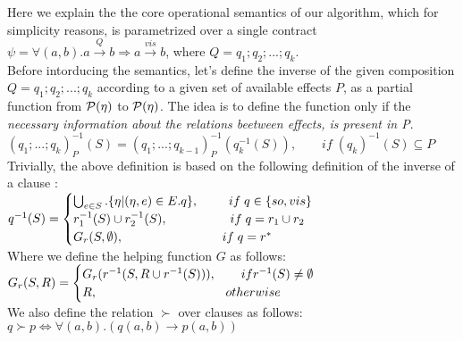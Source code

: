 Here we explain the the core operational semantics of our algorithm, which for simplicity reasons, 
is parametrized over a single contract 
$\psi = \forall (a,b). a \xrightarrow{Q} b  \Rightarrow a
\xrightarrow{vis} b$, where $Q=q_1;q_2;...;q_k$. 
\\Before intorducing the semantics, let's define the inverse of the
given composition $Q=q_1;q_2;...;q_k$ according to a given
set of available effects $P$, as a partial function from $\mathcal{P}(\eta)$ to
$\mathcal{P}(\eta)$. The idea is to define the function only if the \emph{necessary information about the relations beetween effects, is present in P}.
\\ $
(q_1;...;q_k)^{-1}_P (S)= (q_1;...;q_{k-1})^{-1}_P (q^{-1}_{k}(S)), \qquad 
if \; (q_k)^{-1}(S) \subseteq P$
\\Trivially, the above definition is based on the following definition of
the inverse of a clause :\\
$q^{-1}(S) = 
\begin{cases}
\bigcup^{}_{e\in S}. \{\eta|(\eta,e) \in E.q \}, \hspace{8.5 mm} if \;
q\in\{so,vis\} \\ 
r_1^{-1}(S)\cup r_2^{-1}(S), \qquad \spc \qquad if \; q=r_1\cup r_2\\
G_{r}(S,\emptyset), \quad \hspace{17.25 mm} \qquad if \; q=r^* 
\end{cases}
$
\\ Where we define the helping function $G$ as follows: 
$G_r(S,R) =
\begin{cases} 
G_r(r^{-1}(S,R\cup r^{-1}(S))), \qquad if r^{-1}(S) \neq \emptyset  \\
R,                          \hspace{36.1mm} otherwise
\end{cases}$ \\
We also define the relation $\succ$ over clauses as follows: $q \succ
p \iff \forall (a,b). (q(a,b) \rightarrow p(a,b)) $



